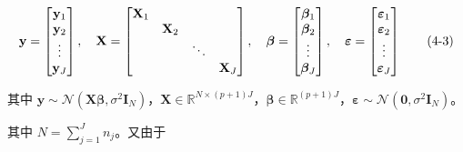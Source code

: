 \documentclass[12pt,a4paper]{ctexart}
\makeatletter
\numberwithin{figure}{section}
\numberwithin{table}{section}
\let\ltx@orig@tag\tag
\renewcommand{\tag}[1]{\refstepcounter{equation}\ltx@orig@tag{#1}}%
\makeatother
\begin{document}
\begin{equation}
\mathbf{y} = \begin{bmatrix} \mathbf{y}_1 \\ \mathbf{y}_2 \\ \vdots \\ \mathbf{y}_J \end{bmatrix}, \quad
\mathbf{X} = \begin{bmatrix} \mathbf{X}_1 & & & \\ & \mathbf{X}_2 & & \\ & & \ddots & \\ & & & \mathbf{X}_J \end{bmatrix}, \quad
\boldsymbol{\beta} = \begin{bmatrix} \boldsymbol{\beta}_1 \\ \boldsymbol{\beta}_2 \\ \vdots \\ \boldsymbol{\beta}_J \end{bmatrix}, \quad
\boldsymbol{\varepsilon} = \begin{bmatrix} \boldsymbol{\varepsilon}_1 \\ \boldsymbol{\varepsilon}_2 \\ \vdots \\ \boldsymbol{\varepsilon}_J \end{bmatrix}
\tag{4-3}
\end{equation}

其中 $\mathbf{y} \sim \mathcal{N}(\mathbf{X}\boldsymbol{\beta}, \sigma^2 \mathbf{I}_N)$，$\mathbf{X} \in \mathbb{R}^{N \times (p+1)J}$，$\boldsymbol{\beta} \in \mathbb{R}^{(p+1)J}$，$\boldsymbol{\varepsilon} \sim \mathcal{N}(\mathbf{0}, \sigma^2 \mathbf{I}_N)$。

其中 $N = \sum_{j=1}^{J} n_j$。又由于
\end{document}
